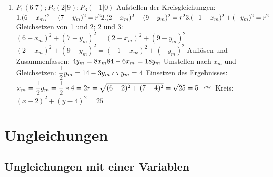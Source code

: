 \begin{enumerate}
		\item $P_1(6|7); P_2(2|9); P_3(-1|0)$ \newline \newline
		Aufstellen der Kreisgleichungen:\newline
		 $1. (6-x_m)^2 + (7-y_m)^2 = r^2\\
		 2.  (2-x_m)^2 + (9-y_m)^2 = r^2\\
		 3.  (-1-x_m)^2 + (-y_m)^2 = r^2$ \newline \newline
		Gleichsetzen von 1 und 2; 2 und 3: \newline
		$(6-x_m)^2 + (7-y_m)^2 = (2-x_m)^2 + (9-y_m)^2$ \newline
		$(2-x_m)^2 + (9-y_m)^2 = (-1-x_m)^2 + (-y_m)^2$ \newline \newline
		Aufl\"osen und Zusammenfassen: \newline
		$4y_m= 8x_m\\
		84-6x_m = 18y_m$ \newline \newline
		Umstellen nach $x_m$ und Gleichsetzen: \newline
		$\dfrac{1}{2}y_m = 14- 3y_m\\
		\curvearrowright y_m = 4$ \newline \newline
		Einsetzen des Ergebnisses: \newline
		$ x_m = \dfrac{1}{2}y_m = \dfrac{1}{2}* 4 = 2\\
		r=\sqrt{(6-2)^2 + (7-4)^2} = \sqrt{25} = 5$ \newline \newline
		$\curvearrowright$ Kreis: $(x-2)^2 + (y-4)^2 = 25$
		


\end{enumerate}
\section{Ungleichungen}

\subsection{Ungleichungen mit einer Variablen}

